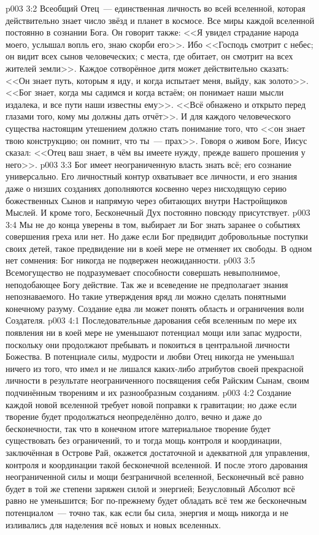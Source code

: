 \vs p003 3:2 Всеобщий Отец~--- единственная личность во всей вселенной, которая действительно знает число звёзд и планет в космосе. Все миры каждой вселенной постоянно в сознании Бога. Он говорит также: <<Я увидел страдание народа моего, услышал вопль его, знаю скорби его>>. Ибо <<Господь смотрит с небес; он видит всех сынов человеческих; с места, где обитает, он смотрит на всех жителей земли>>. Каждое сотворённое дитя может действительно сказать: <<Он знает путь, которым я иду, и когда испытает меня, выйду, как золото>>. <<Бог знает, когда мы садимся и когда встаём; он понимает наши мысли издалека, и все пути наши известны ему>>. <<Всё обнажено и открыто перед глазами того, кому мы должны дать отчёт>>. И для каждого человеческого существа настоящим утешением должно стать понимание того, что <<он знает твою конструкцию; он помнит, что ты~--- прах>>. Говоря о живом Боге, Иисус сказал: <<Отец ваш знает, в чём вы имеете нужду, прежде вашего прошения у него>>.
\vs p003 3:3 Бог имеет неограниченную власть знать всё; его сознание универсально. Его личностный контур охватывает все личности, и его знания даже о низших созданиях дополняются косвенно через нисходящую серию божественных Сынов и напрямую через обитающих внутри Настройщиков Мыслей. И кроме того, Бесконечный Дух постоянно повсюду присутствует.
\vs p003 3:4 Мы не до конца уверены в том, выбирает ли Бог знать заранее о событиях совершения греха или нет. Но даже если Бог предвидит добровольные поступки своих детей, такое предвидение ни в коей мере не отменяет их свободы. В одном нет сомнения: Бог никогда не подвержен неожиданности.
\vs p003 3:5 \pc Всемогущество не подразумевает способности совершать невыполнимое, неподобающее Богу действие. Так же и всеведение не предполагает знания непознаваемого. Но такие утверждения вряд ли можно сделать понятными конечному разуму. Создание едва ли может понять область и ограничения воли Создателя.
\vs p003 4:1 Последовательные дарования себя вселенным по мере их появления ни в коей мере не уменьшают потенциал мощи или запас мудрости, поскольку они продолжают пребывать и покоиться в центральной личности Божества. В потенциале силы, мудрости и любви Отец никогда не уменьшал ничего из того, что имел и не лишался каких\hyp{}либо атрибутов своей прекрасной личности в результате неограниченного посвящения себя Райским Сынам, своим подчинённым творениям и их разнообразным созданиям.
\vs p003 4:2 Создание каждой новой вселенной требует новой поправки к гравитации; но даже если творение будет продолжаться неопределённо долго, вечно и даже до бесконечности, так что в конечном итоге материальное творение будет существовать без ограничений, то и тогда мощь контроля и координации, заключённая в Острове Рай, окажется достаточной и адекватной для управления, контроля и координации такой бесконечной вселенной. И после этого дарования неограниченной силы и мощи безграничной вселенной, Бесконечный всё равно будет в той же степени заряжен силой и энергией; Безусловный Абсолют всё равно не уменьшится; Бог по\hyp{}прежнему будет обладать всё тем же бесконечным потенциалом~--- точно так, как если бы сила, энергия и мощь никогда и не изливались для наделения всё новых и новых вселенных.
